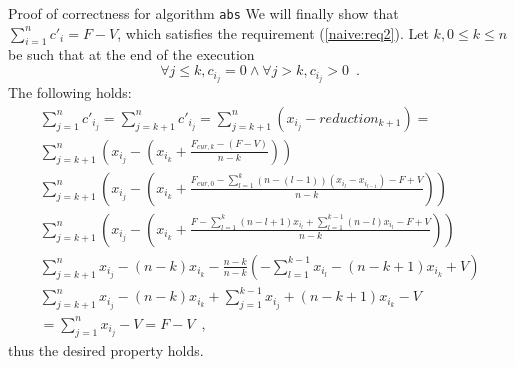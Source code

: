 \begin{sepproof}{Proof of correctness for algorithm \texttt{abs}}
  We will finally show that $\sum\limits_{i=1}^nc'_i = F - V$, which satisfies the requirement (\ref{naive:req2}).
  Let $k, 0 \leq k \leq n$ be such that at the end of the execution
  \begin{equation*}
    \forall j \leq k, c_{i_j} = 0 \wedge \forall j > k, c_{i_j} > 0 \enspace.
  \end{equation*}
  The following holds:
  \begin{equation*}
  \begin{gathered}
    \sum\limits_{j=1}^nc'_{i_j} = \sum\limits_{j=k+1}^nc'_{i_j} = \sum\limits_{j=k+1}^n\left(x_{i_j} -
    reduction_{k+1}\right) = \\
    \sum\limits_{j=k+1}^n\left(x_{i_j} - \left(x_{i_k} + \frac{F_{cur, k} - \left(F - V\right)}{n - k}\right)\right) \\
    \sum\limits_{j=k+1}^n\left(x_{i_j} - \left(x_{i_k} + \frac{F_{cur, 0} - \sum\limits_{l=1}^k\left(n
    - \left(l - 1\right)\right)\left(x_{i_l} - x_{i_{l-1}}\right) - F + V}{n - k}\right)\right) \\
    \sum\limits_{j=k+1}^n\left(x_{i_j} - \left(x_{i_k} + \frac{F - \sum\limits_{l=1}^k\left(n - l + 1\right)x_{i_l} +
    \sum\limits_{l=1}^{k-1}\left(n - l\right)x_{i_l} - F + V}{n - k}\right)\right) \\
    \sum\limits_{j=k+1}^nx_{i_j} - \left(n - k\right)x_{i_k} - \frac{n - k}{n - k}\left(-\sum\limits_{l=1}^{k-1}x_{i_l} -
    \left(n - k + 1\right)x_{i_k} + V\right) \\
    \sum\limits_{j=k+1}^nx_{i_j} - \left(n - k\right)x_{i_k} + \sum\limits_{j=1}^{k-1}x_{i_j} +
    \left(n - k + 1\right)x_{i_k} - V \\
    = \sum\limits_{j=1}^nx_{i_j} - V = F - V \enspace,
  \end{gathered}
  \end{equation*}
  thus the desired property holds.
\end{sepproof}
